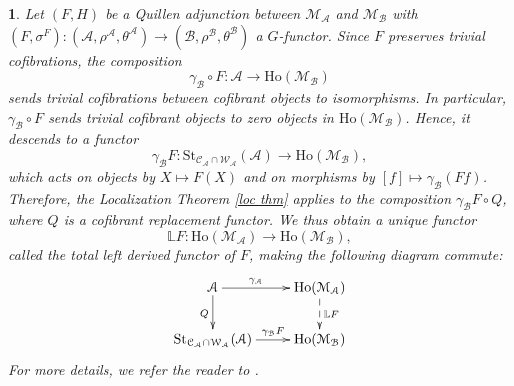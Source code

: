 \documentclass[12pt,twoside]{amsart}
\theoremstyle{bfupright head,slanted body}
\theoremstyle{bfupright head,upright body}
\theoremstyle{fixed bf head,slanted body}
\theoremstyle{fixed bf head,upright body}
\theoremstyle{numbered paragraph}
\newtheorem{ipg}[res]{}
\newcommand{\thmcite}[2][?]{\cite[Theorem~#1]{#2}}
\numberwithin{equation}{res}
\newcommand{\calC}{\mathcal{C}}
\newcommand{\calW}{\mathcal{W}}
\newcommand{\calA}{\mathcal{A}}
\newcommand{\calB}{\mathcal{B}}
\newcommand{\calM}{\mathcal{M}}
\newcommand{\Ho}{\mathrm{Ho}}
\newcommand{\St}{\mathrm{St}}
\begin{document}
\begin{ipg} \label{total LF}
Let \((F,H)\) be a Quillen adjunction between \(\calM_\calA\) and \(\calM_\calB\) with \((F,\sigma^F):(\calA,\rho^\calA,\theta^\calA)\to (\calB,\rho^\calB,\theta^\calB)\) a \(G\)-functor. Since \(F\) preserves trivial cofibrations, the composition
\[\gamma_{\calB}\circ F : \calA \longrightarrow \Ho(\calM_{\calB})\]
sends trivial cofibrations between cofibrant objects to isomorphisms. In particular, \(\gamma_{\calB}\circ F\) sends trivial cofibrant objects to zero objects in \(\Ho(\calM_{\calB})\). Hence, it descends to a functor
\[\gamma_{\calB} F : \St_{\calC_\calA \cap \calW_\calA}(\calA) \longrightarrow \Ho(\calM_{\calB}),\]
which acts on objects by \(X\mapsto F(X)\) and on morphisms by \([f]\mapsto \gamma_{\calB}(Ff)\).
Therefore, the Localization Theorem \ref{loc thm} applies to the composition \(\gamma_{\calB} F\circ Q\), where \(Q\) is a cofibrant replacement functor. We thus obtain a unique functor
\[
\mathbb{L}F : \Ho(\calM_\calA) \longrightarrow \Ho(\calM_\calB),
\]
called the \emph{total left derived functor} of \(F\), making the following diagram commute:
\[
\xymatrix@R=0.75cm{
   \calA
\ar[r]^-{\gamma_{\calA}}
\ar[d]_{Q}
&  \Ho(\calM_\calA)
\ar@{-->}[d]^-{\mathbb{L}F} \\
   \St_{\calC_\calA \cap \calW_\calA}(\calA)
\ar[r]^-{\gamma_{\calB} F}
&  \Ho(\calM_\calB)
}
\]
For more details, we refer the reader to \thmcite[7.11]{2025GillBook}.
\end{ipg}
\end{document}
